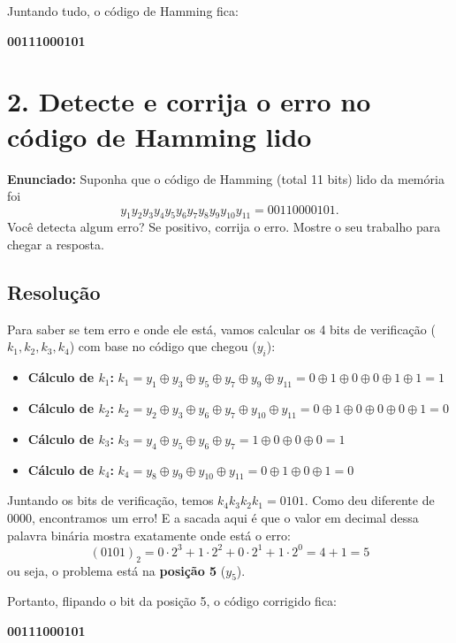 \documentclass{article}
\begin{document}
Juntando tudo, o código de Hamming fica:
\begin{center}
\textbf{00111000101}
\end{center}

\newpage
\section*{2. Detecte e corrija o erro no código de Hamming lido}

\textbf{Enunciado:} Suponha que o código de Hamming (total 11 bits) lido da memória foi 
\[y_{1}y_{2}y_{3}y_{4}y_{5}y_{6}y_{7}y_{8}y_{9}y_{10}y_{11}=00110000101.\]
Você detecta algum erro? Se positivo, corrija o erro. Mostre o seu trabalho para chegar a resposta.

\subsection*{Resolução}
Para saber se tem erro e onde ele está, vamos calcular os 4 bits de verificação ($k_1, k_2, k_3, k_4$) com base no código que chegou ($y_i$):

\begin{itemize}
    \item \textbf{Cálculo de $k_1$:}
    $k_1 = y_1 \oplus y_3 \oplus y_5 \oplus y_7 \oplus y_9 \oplus y_{11} = 0 \oplus 1 \oplus 0 \oplus 0 \oplus 1 \oplus 1 = 1$
    
    \bigskip
    \item \textbf{Cálculo de $k_2$:}
    $k_2 = y_2 \oplus y_3 \oplus y_6 \oplus y_7 \oplus y_{10} \oplus y_{11} = 0 \oplus 1 \oplus 0 \oplus 0 \oplus 0 \oplus 1 = 0$
    
    \bigskip
    \item \textbf{Cálculo de $k_3$:}
    $k_3 = y_4 \oplus y_5 \oplus y_6 \oplus y_7 = 1 \oplus 0 \oplus 0 \oplus 0 = 1$
    
    \bigskip
    \item \textbf{Cálculo de $k_4$:}
    $k_4 = y_8 \oplus y_9 \oplus y_{10} \oplus y_{11} = 0 \oplus 1 \oplus 0 \oplus 1 = 0$
\end{itemize}

Juntando os bits de verificação, temos $k_4k_3k_2k_1 = 0101$. Como deu diferente de $0000$, encontramos um erro! E a sacada aqui é que o valor em decimal dessa palavra binária mostra exatamente onde está o erro:
\[
(0101)_2 = 0 \cdot 2^3 + 1 \cdot 2^2 + 0 \cdot 2^1 + 1 \cdot 2^0 = 4 + 1 = 5
\]
ou seja, o problema está na \textbf{posição 5} ($y_5$).

Portanto, flipando o bit da posição 5, o código corrigido fica:
\begin{center}
\textbf{00111000101}
\end{center}
\end{document}
